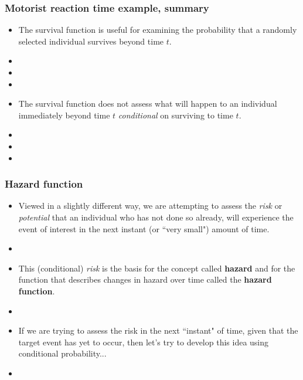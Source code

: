 \begin{frame}
\frametitle{Motorist reaction time example, summary}
\begin{itemize}
\item The survival function is useful for examining the probability that a randomly selected individual survives beyond time $t$.
\item[] %
\item[]
\item[]
\item The survival function does not assess what will happen to an individual immediately beyond time $t$ \textit{conditional} on surviving to time $t$.
\item[] %
\item[]
\item[]
\end{itemize}
\end{frame}

\begin{frame}
\frametitle{Hazard function}
\begin{itemize}
\item Viewed in a slightly different way, we are attempting to assess the \textit{risk} or \textit{potential} that an individual who has not done so already, will experience the event of interest in the next instant (or ``very small") amount of time.
\item[]
\item This (conditional) \textit{risk} is the basis for the concept called \textbf{hazard} and for the function that describes changes in hazard over time called the \textbf{hazard function}.
\item[]
\item If we are trying to assess the risk in the next ``instant" of time, given that the target event has yet to occur, then let's try to develop this idea using conditional probability...
\item[]
\end{itemize}
\end{frame}

